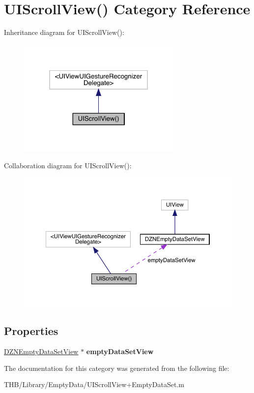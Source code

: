 \hypertarget{category_u_i_scroll_view_07_08}{}\section{U\+I\+Scroll\+View() Category Reference}
\label{category_u_i_scroll_view_07_08}


Inheritance diagram for U\+I\+Scroll\+View()\+:\nopagebreak
\begin{figure}[H]
\begin{center}
\leavevmode
\includegraphics[width=229pt]{category_u_i_scroll_view_07_08__inherit__graph}
\end{center}
\end{figure}


Collaboration diagram for U\+I\+Scroll\+View()\+:\nopagebreak
\begin{figure}[H]
\begin{center}
\leavevmode
\includegraphics[width=350pt]{category_u_i_scroll_view_07_08__coll__graph}
\end{center}
\end{figure}
\subsection*{Properties}
\begin{DoxyCompactItemize}
\item 
\mbox{\label{category_u_i_scroll_view_07_08_a1a09563a2739503580d254d637de4958}} 
\mbox{\hyperlink{interface_d_z_n_empty_data_set_view}{D\+Z\+N\+Empty\+Data\+Set\+View}} $\ast$ {\bfseries empty\+Data\+Set\+View}
\end{DoxyCompactItemize}


The documentation for this category was generated from the following file\+:\begin{DoxyCompactItemize}
\item 
T\+H\+B/\+Library/\+Empty\+Data/U\+I\+Scroll\+View+\+Empty\+Data\+Set.\+m\end{DoxyCompactItemize}
